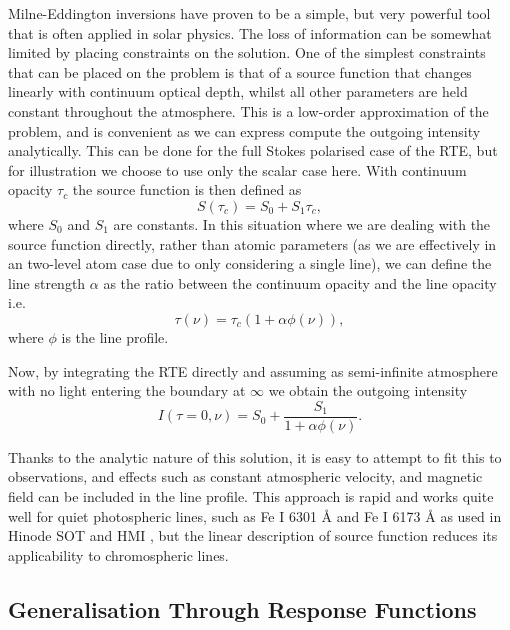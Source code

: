 Milne-Eddington inversions have proven to be a simple, but very powerful tool that is often applied in solar physics.
The loss of information can be somewhat limited by placing constraints on the solution. One of the simplest constraints that can be placed on the problem is that of a source function that changes linearly with continuum optical depth, whilst all other parameters are held constant throughout the atmosphere.
This is a low-order approximation of the problem, and is convenient as we can express compute the outgoing intensity analytically.
This can be done for the full Stokes polarised case of the RTE, but for illustration we choose to use only the scalar case here.
With continuum opacity $\tau_c$ the source function is then defined as
\begin{equation}
    S(\tau_c) = S_0 + S_1 \tau_c,
\end{equation}
where $S_0$ and $S_1$ are constants.
In this situation where we are dealing with the source function directly, rather than atomic parameters (as we are effectively in an two-level atom case due to only considering a single line), we can define the line strength $\alpha$ as the ratio between the continuum opacity and the line opacity i.e.
\begin{equation}
    \tau(\nu) = \tau_c (1 + \alpha \phi(\nu)),
\end{equation}
where $\phi$ is the line profile.

Now, by integrating the RTE directly and assuming as semi-infinite atmosphere with no light entering the boundary at $\infty$ we obtain the outgoing intensity
\begin{equation}
I(\tau=0, \nu) = S_0 + \frac{S_1}{1 + \alpha\phi(\nu)}.
\end{equation}

Thanks to the analytic nature of this solution, it is easy to attempt to fit this to observations, and effects such as constant atmospheric velocity, and magnetic field can be included in the line profile.
This approach is rapid and works quite well for quiet photospheric lines, such as Fe I 6301 \AA{} and Fe I 6173 \AA{} as used in Hinode SOT and HMI \citep[e.g.][]{Centeno2014}, but the linear description of source function reduces its applicability to chromospheric lines.

\subsection{Generalisation Through Response Functions}\label{Sec:IntroRfs}


